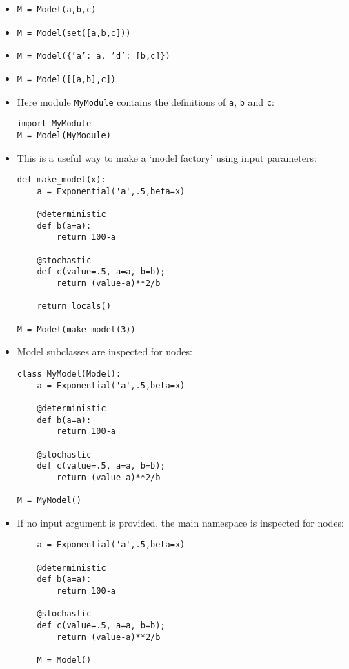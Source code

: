 \begin{itemize}
    \item \texttt{M = Model(a,b,c)}
    \item \texttt{M = Model(set([a,b,c]))}
    \item \texttt{M = Model(\{'a': a, 'd': [b,c]\})}
    \item \texttt{M = Model([[a,b],c])}
    \item Here module \texttt{MyModule} contains the definitions of \texttt{a}, \texttt{b} and \texttt{c}:\begin{verbatim}
import MyModule
M = Model(MyModule)
    \end{verbatim}
    \item This is a useful way to make a `model factory' using input parameters:
    \begin{verbatim}
def make_model(x):
    a = Exponential('a',.5,beta=x)
    
    @deterministic
    def b(a=a):
        return 100-a
    
    @stochastic
    def c(value=.5, a=a, b=b);
        return (value-a)**2/b
        
    return locals()
    
M = Model(make_model(3))
    \end{verbatim}
    \item Model subclasses are inspected for nodes:
    \begin{verbatim}
class MyModel(Model):
    a = Exponential('a',.5,beta=x)

    @deterministic
    def b(a=a):
        return 100-a

    @stochastic
    def c(value=.5, a=a, b=b);
        return (value-a)**2/b        
        
M = MyModel()
    \end{verbatim}    
    \item If no input argument is provided, the main namespace is inspected for nodes:
    \begin{verbatim}
    a = Exponential('a',.5,beta=x)

    @deterministic
    def b(a=a):
        return 100-a

    @stochastic
    def c(value=.5, a=a, b=b);
        return (value-a)**2/b        
    
    M = Model()
    \end{verbatim}

\end{itemize}

